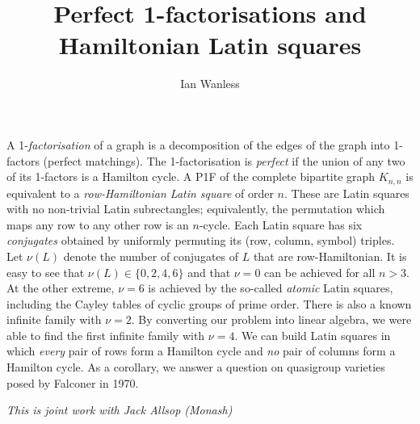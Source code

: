 \documentclass[a4paper]{amsart}
\date{}
\begin{document}
\title{Perfect 1-factorisations and Hamiltonian Latin squares}
\author{Ian Wanless} 
\address{Monash University} 

\maketitle

  A 1-\emph{factorisation} of a graph is a decomposition of the edges of the graph into 1-factors (perfect matchings). The 1-factorisation is \emph{perfect} if the union of any two of its 1-factors is a Hamilton cycle.  A P1F of the complete bipartite graph $K_{n,n}$ is equivalent to a \emph{row-Hamiltonian Latin square} of order $n$. These are Latin squares with no non-trivial Latin subrectangles; equivalently, the permutation which maps any row to any other row is an $n$-cycle. Each Latin square has six \emph{conjugates} obtained by uniformly permuting its (row, column, symbol) triples. Let $\nu(L)$ denote the number of conjugates of $L$ that are row-Hamiltonian. It is easy to see that $\nu(L)\in\{0,2,4,6\}$ and that $\nu=0$ can be achieved for all $n>3$. At the other extreme, $\nu=6$ is achieved by the so-called \emph{atomic} Latin squares, including the Cayley tables of cyclic groups of prime order. There is also a known infinite family with $\nu=2$. By converting our problem into linear algebra, we were able to find the first infinite family with $\nu=4$. We can build Latin squares in which \emph{every} pair of rows form a Hamilton cycle and \emph{no} pair of columns form a Hamilton cycle. As a corollary, we answer a question on quasigroup varieties posed by Falconer in 1970.

\emph{This is joint work with Jack Allsop (Monash)}
\end{document}
